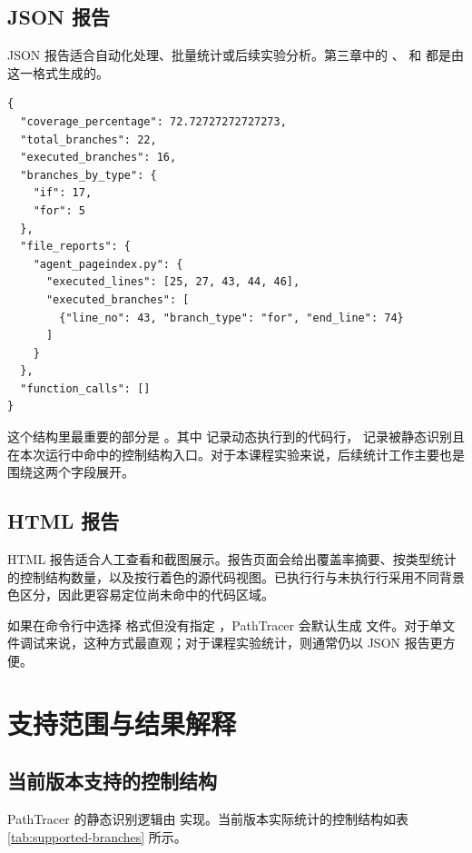 \subsection{JSON 报告}

JSON 报告适合自动化处理、批量统计或后续实验分析。第三章中的 、 和  都是由这一格式生成的。

\begin{lstlisting}[language={}, caption={JSON 报告结构示例}]
{
  "coverage_percentage": 72.72727272727273,
  "total_branches": 22,
  "executed_branches": 16,
  "branches_by_type": {
    "if": 17,
    "for": 5
  },
  "file_reports": {
    "agent_pageindex.py": {
      "executed_lines": [25, 27, 43, 44, 46],
      "executed_branches": [
        {"line_no": 43, "branch_type": "for", "end_line": 74}
      ]
    }
  },
  "function_calls": []
}
\end{lstlisting}

这个结构里最重要的部分是 。其中  记录动态执行到的代码行， 记录被静态识别且在本次运行中命中的控制结构入口。对于本课程实验来说，后续统计工作主要也是围绕这两个字段展开。

\subsection{HTML 报告}

HTML 报告适合人工查看和截图展示。报告页面会给出覆盖率摘要、按类型统计的控制结构数量，以及按行着色的源代码视图。已执行行与未执行行采用不同背景色区分，因此更容易定位尚未命中的代码区域。

如果在命令行中选择  格式但没有指定 ，PathTracer 会默认生成  文件。对于单文件调试来说，这种方式最直观；对于课程实验统计，则通常仍以 JSON 报告更方便。

\section{支持范围与结果解释}

\subsection{当前版本支持的控制结构}

PathTracer 的静态识别逻辑由  实现。当前版本实际统计的控制结构如表 \ref{tab:supported-branches} 所示。

